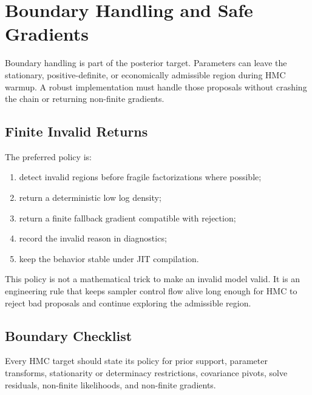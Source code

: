 \chapter{Boundary Handling and Safe Gradients}
\label{ch:bf-boundary-gradients}

Boundary handling is part of the posterior target.  Parameters can leave the
stationary, positive-definite, or economically admissible region during HMC
warmup.  A robust implementation must handle those proposals without crashing
the chain or returning non-finite gradients.

\section{Finite Invalid Returns}
\label{sec:bf-finite-invalid-returns}

The preferred policy is:
\begin{enumerate}[label=(\roman*)]
  \item detect invalid regions before fragile factorizations where possible;
  \item return a deterministic low log density;
  \item return a finite fallback gradient compatible with rejection;
  \item record the invalid reason in diagnostics;
  \item keep the behavior stable under JIT compilation.
\end{enumerate}

This policy is not a mathematical trick to make an invalid model valid.  It is
an engineering rule that keeps sampler control flow alive long enough for HMC
to reject bad proposals and continue exploring the admissible region.

\section{Boundary Checklist}
\label{sec:bf-boundary-checklist}

Every HMC target should state its policy for prior support, parameter
transforms, stationarity or determinacy restrictions, covariance pivots, solve
residuals, non-finite likelihoods, and non-finite gradients.
